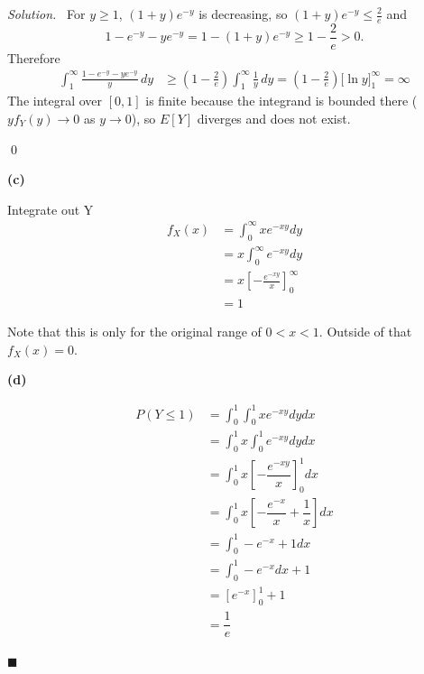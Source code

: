 \documentclass[11pt]{article}
\newenvironment{solution}
{\par\medskip\noindent\textit{Solution.}\ }
{\hfill$\blacksquare$\par\medskip}
\begin{document}
\begin{solution}
        For $y \geq 1$, $(1 + y)e^{-y}$ is decreasing, so $(1 + y)e^{-y} \leq \frac{2}{e}$ and
        \[
            1 - e^{-y} - y e^{-y} = 1 - (1 + y)e^{-y} \geq 1 - \frac{2}{e} > 0 .
        \]
        Therefore
        \begin{align*}
            \int_{1}^{\infty} \frac{1 - e^{-y} - y e^{-y}}{y}\, dy
            &\geq \left(1 - \frac{2}{e}\right) \int_{1}^{\infty} \frac{1}{y}\, dy
            = \left(1 - \frac{2}{e}\right) \Big[\ln y\Big]_{1}^{\infty} = \infty
        \end{align*}
        The integral over $[0,1]$ is finite because the integrand is bounded there
        ($y f_Y(y) \to 0$ as $y \to 0$), so $E[Y]$ diverges and does not exist.

        \qed

        \vspace{1em}
        \textbf{(c)}

        Integrate out Y
        \begin{align*}
            f_X(x) &= \int_{0}^{\infty} xe^{-xy} dy \\
            &= x \int_{0}^{\infty} e^{-xy} dy \\
            &= x \left[ -\frac{e^{-xy}}{x} \right]_{0}^{\infty} \\
            &= 1
        \end{align*}

        Note that this is only for the original range of $0 < x < 1$.
        Outside of that $f_X(x) = 0$.

        \vspace{1em}
        \textbf{(d)}

        \begin{align*}
            P(Y \leq 1) &= \int_{0}^{1} \int_{0}^{1} xe^{-xy} dy dx \\
            &= \int_{0}^{1} x \int_{0}^{1} e^{-xy} dy dx \\
            &= \int_{0}^{1} x \left[ -\dfrac{e^{-xy}}{x} \right]_0^{1} dx \\
            &= \int_{0}^{1} x \left[ -\dfrac{e^{-x}}{x} + \dfrac{1}{x} \right] dx \\
            &= \int_{0}^{1} -e^{-x} + 1 dx \\
            &= \int_{0}^{1} -e^{-x} dx + 1 \\
            &= \left[e^{-x}\right]_{0}^{1} + 1 \\
            &= \dfrac{1}{e}
        \end{align*}


\end{solution}
\end{document}
